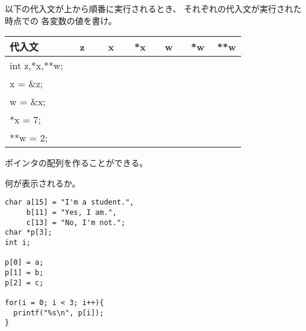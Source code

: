 \documentclass[12pt,a4j]{jarticle}
\newcounter{toi}
\def\toi{%
\bigskip\bigskip\noindent
\addtocounter{toi}{1}
\shadowbox{\bfseries\large 問\thetoi}
\nopagebreak[4]\bigskip\nopagebreak[4]
}
\begin{document}
\toi

以下の代入文が上から順番に実行されるとき、
それぞれの代入文が実行された時点での
各変数の値を書け。

\begin{center}\ttfamily
 \begin{tabular}{|l|c|c|c|c|c|c|}\hline
  代入文            &   z & x & *x & w & *w & **w\\ \hline\hline
  int z,*x,**w;   & 　　& 　　& 　　& 　　& 　　& 　　\\  \cline{2-7}
  x = \&z;         & 　　& 　　& 　　& 　　& 　　& 　　\\  \cline{2-7}
  w = \&x;        & 　　& 　　& 　　& 　　& 　　& 　　\\  \cline{2-7}
  *x = 7;            & 　　& 　　& 　　& 　　& 　　& 　　\\  \cline{2-7}
  **w = 2;            & 　　& 　　& 　　& 　　& 　　& 　　\\  \hline
 \end{tabular}
\end{center}









\toi

ポインタの配列を作ることができる。

何が表示されるか。

\begin{verbatim}
char a[15] = "I'm a student.", 
     b[11] = "Yes, I am.",
     c[13] = "No, I'm not.";
char *p[3];
int i;

p[0] = a;
p[1] = b;
p[2] = c;

for(i = 0; i < 3; i++){
  printf("%s\n", p[i]);
}
\end{verbatim}

\end{document}
